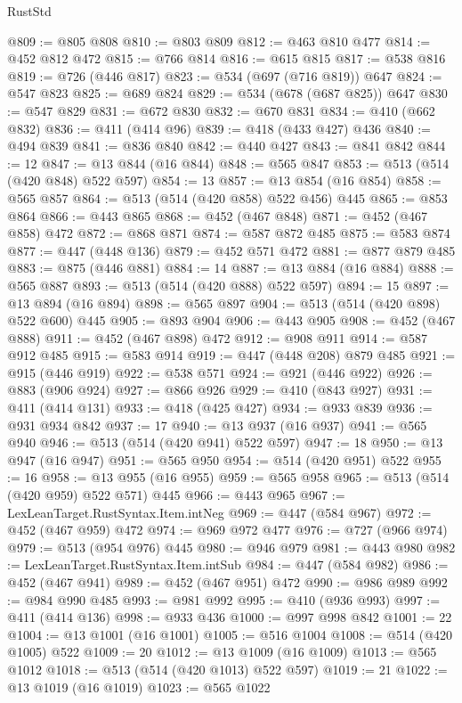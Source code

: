\begin{lexlean}{RustStd}
\begin{coremodule}
{\begin{coremodule}
{{{{{{{{{{{@809 := @805 @808
@810 := @803 @809
@812 := @463 @810 @477
@814 := @452 @812 @472
@815 := @766 @814
@816 := @615 @815
@817 := @538 @816
@819 := @726 (@446 @817)
@823 := @534 (@697 (@716 @819)) @647
@824 := @547 @823
@825 := @689 @824
@829 := @534 (@678 (@687 @825)) @647
@830 := @547 @829
@831 := @672 @830
@832 := @670 @831
@834 := @410 (@662 @832)
@836 := @411 (@414 @96)
@839 := @418 (@433 @427) @436
@840 := @494 @839
@841 := @836 @840
@842 := @440 @427
@843 := @841 @842
@844 := 12
@847 := @13 @844 (@16 @844)
@848 := @565 @847
@853 := @513 (@514 (@420 @848) @522 @597)
@854 := 13
@857 := @13 @854 (@16 @854)
@858 := @565 @857
@864 := @513 (@514 (@420 @858) @522 @456) @445
@865 := @853 @864
@866 := @443 @865
@868 := @452 (@467 @848)
@871 := @452 (@467 @858) @472
@872 := @868 @871
@874 := @587 @872 @485
@875 := @583 @874
@877 := @447 (@448 @136)
@879 := @452 @571 @472
@881 := @877 @879 @485
@883 := @875 (@446 @881)
@884 := 14
@887 := @13 @884 (@16 @884)
@888 := @565 @887
@893 := @513 (@514 (@420 @888) @522 @597)
@894 := 15
@897 := @13 @894 (@16 @894)
@898 := @565 @897
@904 := @513 (@514 (@420 @898) @522 @600) @445
@905 := @893 @904
@906 := @443 @905
@908 := @452 (@467 @888)
@911 := @452 (@467 @898) @472
@912 := @908 @911
@914 := @587 @912 @485
@915 := @583 @914
@919 := @447 (@448 @208) @879 @485
@921 := @915 (@446 @919)
@922 := @538 @571
@924 := @921 (@446 @922)
@926 := @883 (@906 @924)
@927 := @866 @926
@929 := @410 (@843 @927)
@931 := @411 (@414 @131)
@933 := @418 (@425 @427)
@934 := @933 @839
@936 := @931 @934 @842
@937 := 17
@940 := @13 @937 (@16 @937)
@941 := @565 @940
@946 := @513 (@514 (@420 @941) @522 @597)
@947 := 18
@950 := @13 @947 (@16 @947)
@951 := @565 @950
@954 := @514 (@420 @951) @522
@955 := 16
@958 := @13 @955 (@16 @955)
@959 := @565 @958
@965 := @513 (@514 (@420 @959) @522 @571) @445
@966 := @443 @965
@967 := LexLeanTarget.RustSyntax.Item.intNeg
@969 := @447 (@584 @967)
@972 := @452 (@467 @959) @472
@974 := @969 @972 @477
@976 := @727 (@966 @974)
@979 := @513 (@954 @976) @445
@980 := @946 @979
@981 := @443 @980
@982 := LexLeanTarget.RustSyntax.Item.intSub
@984 := @447 (@584 @982)
@986 := @452 (@467 @941)
@989 := @452 (@467 @951) @472
@990 := @986 @989
@992 := @984 @990 @485
@993 := @981 @992
@995 := @410 (@936 @993)
@997 := @411 (@414 @136)
@998 := @933 @436
@1000 := @997 @998 @842
@1001 := 22
@1004 := @13 @1001 (@16 @1001)
@1005 := @516 @1004
@1008 := @514 (@420 @1005) @522
@1009 := 20
@1012 := @13 @1009 (@16 @1009)
@1013 := @565 @1012
@1018 := @513 (@514 (@420 @1013) @522 @597)
@1019 := 21
@1022 := @13 @1019 (@16 @1019)
@1023 := @565 @1022
}}}}}}}}}}}
\end{coremodule}}
\end{coremodule}
\end{lexlean}
